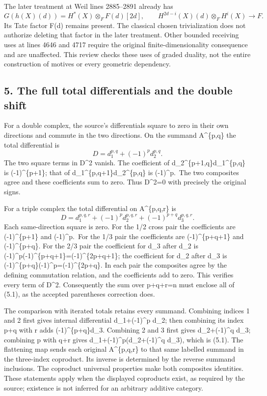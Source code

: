 \documentclass[11pt]{article}
\begin{document}
The later treatment at Weil lines 2885--2891 already has \[
G(h(X)(d))=H^*(X)\otimes_F F(d)[2d],
\qquad
H^{2d-i}(X)(d)\otimes_F H^i(X)\longrightarrow F.
\] Its Tate factor F(d) remains present. The classical chosen trivialization does not authorize deleting that factor in the later treatment. Other bounded receiving uses at lines 4646 and 4717 require the original finite-dimensionality consequence and are unaffected. This review checks these uses of graded duality, not the entire construction of motives or every geometric dependency.

\subsection{5. The full total differentials and the double shift}\label{note-03-the-full-total-differentials-and-the-double-shift}

For a double complex, the source's differentials square to zero in their own directions and commute in the two directions. On the summand A\^{}\{p,q\} the total differential is \[
D=d_1^{p,q}+(-1)^p d_2^{p,q}.
\] The two square terms in D\^{}2 vanish. The coefficient of d\_2\^{}\{p+1,q\}d\_1\^{}\{p,q\} is (-1)\^{}\{p+1\}; that of d\_1\^{}\{p,q+1\}d\_2\^{}\{p,q\} is (-1)\^{}p.~The two composites agree and these coefficients sum to zero. Thus D\^{}2=0 with precisely the original signs.

For a triple complex the total differential on A\^{}\{p,q,r\} is \[
D=d_1^{p,q,r}+(-1)^p d_2^{p,q,r}
                    +(-1)^{p+q}d_3^{p,q,r}.              \tag{5.1}
\] Each same-direction square is zero. For the 1/2 cross pair the coefficients are (-1)\^{}\{p+1\} and (-1)\^{}p.~For the 1/3 pair the coefficients are (-1)\^{}\{p+q+1\} and (-1)\^{}\{p+q\}. For the 2/3 pair the coefficient for d\_3 after d\_2 is (-1)\^{}p(-1)\^{}\{p+q+1\}=(-1)\^{}\{2p+q+1\}; the coefficient for d\_2 after d\_3 is (-1)\^{}\{p+q\}(-1)\^{}p=(-1)\^{}\{2p+q\}. In each pair the composites agree by the defining commutation relation, and the coefficients add to zero. This verifies every term of D\^{}2. Consequently the sum over p+q+r=n must enclose all of (5.1), as the accepted parentheses correction does.

The comparison with iterated totals retains every summand. Combining indices 1 and 2 first gives internal differential d\_1+(-1)\^{}p d\_2; then combining its index p+q with r adds (-1)\^{}\{p+q\}d\_3. Combining 2 and 3 first gives d\_2+(-1)\^{}q d\_3; combining p with q+r gives d\_1+(-1)\^{}p(d\_2+(-1)\^{}q d\_3), which is (5.1). The flattening map sends each original A\^{}\{p,q,r\} to that same labelled summand in the three-index coproduct. Its inverse is determined by the reverse summand inclusions. The coproduct universal properties make both composites identities. These statements apply when the displayed coproducts exist, as required by the source; existence is not inferred for an arbitrary additive category.
\end{document}
